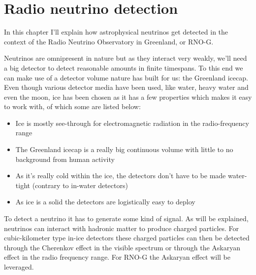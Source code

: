 \chapter{Radio neutrino detection}
\label{chap:RND}
In this chapter I'll explain how astrophysical neutrinos get detected in the
context of the Radio Neutrino Observatory in Greenland, or RNO-G.

Neutrinos are omnipresent in nature but as they interact very weakly, we'll need
a big detector to detect reasonable amounts in finite timespans.  
To this end we can make use of a detector volume nature has
built for us: the Greenland icecap.  Even though various detector media
have been used, like water\cite{SuperKamio}, heavy water
\cite{SNO:1999crp} and
even the moon\cite{numoon}, ice has been chosen as it has a few properties which makes it easy to
work with, of which some are listed below:
\begin{itemize}
  \item Ice is mostly see-through for electromagnetic radiation in the radio-frequency range
  \item The Greenland icecap is a really big continuous volume with little to no background from human activity
  \item As it's really cold within the ice, the detectors don't have to be made water-tight (contrary
	  to in-water detectors)
  \item As ice is a solid the detectors are logistically easy to deploy
\end{itemize}

To detect a neutrino it has to generate some kind of signal. As will be
explained, neutrinos can interact with hadronic matter to produce charged
particles. For cubic-kilometer type in-ice detectors these charged particles can then
be detected through the Cherenkov effect in the visible spectrum or
through the Askaryan effect in the radio frequency range.
For RNO-G the Askaryan effect will be leveraged.

